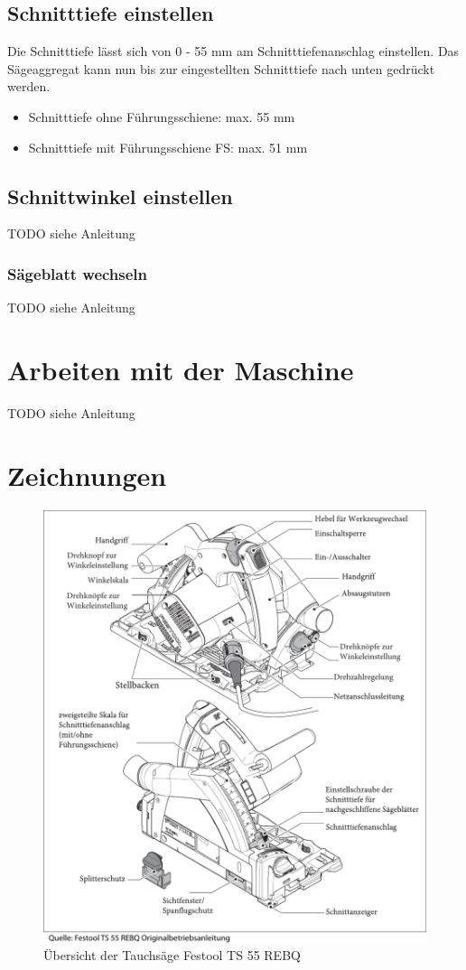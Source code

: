 \documentclass{\basedir/fablab-document}
\begin{document}
\subsection{Schnitttiefe einstellen}
Die Schnitttiefe lässt sich von 0 - 55 mm am Schnitttiefenanschlag einstellen. Das Sägeaggregat kann nun bis zur eingestellten Schnitttiefe nach unten gedrückt werden. 
\begin{itemize}
\item Schnitttiefe ohne Führungsschiene: max. 55 mm
\item Schnitttiefe mit Führungsschiene FS: max. 51 mm
\end{itemize}

\subsection{Schnittwinkel einstellen}
TODO siehe Anleitung

\subsubsection{Sägeblatt wechseln}
TODO siehe Anleitung

\section{Arbeiten mit der Maschine}
TODO siehe Anleitung

\section{Zeichnungen}

\begin{figure}[h]
	\centering
	\includegraphics[width=1\textwidth]{img/festool-uebersicht.pdf}
	\caption{Übersicht der Tauchsäge Festool TS 55 REBQ}
	\label{fig:uebersicht}
\end{figure}
\end{document}
